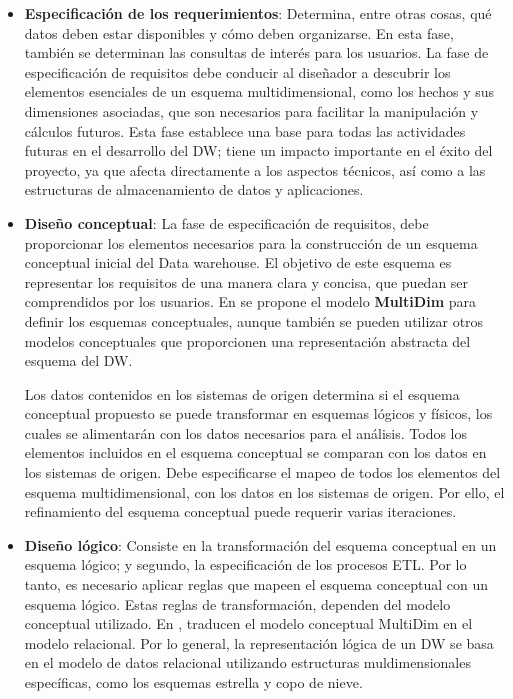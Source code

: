 \documentclass[a4paper,11pt]{article}
\begin{document}
    \begin{itemize}
      \item \textbf{Especificación de los requerimientos}:
      Determina, entre otras cosas, qué datos deben estar disponibles y cómo deben organizarse. En esta fase, también se determinan las consultas de interés
      para los usuarios. La fase de especificación de requisitos debe conducir al diseñador a descubrir los elementos esenciales de un esquema multidimensional,
      como los hechos y sus dimensiones asociadas, que son necesarios para facilitar la manipulación y cálculos futuros. Esta fase establece una base para todas
      las actividades futuras en el desarrollo del DW; tiene un impacto importante en el éxito del proyecto, ya que afecta directamente a los aspectos técnicos,
      así como a las estructuras de almacenamiento de datos y aplicaciones.
      
      \item \textbf{Diseño conceptual}:
      La fase de especificación de requisitos, debe proporcionar los elementos necesarios para la construcción de un esquema conceptual inicial del Data warehouse.
      El objetivo de este esquema es representar los requisitos de una manera clara y concisa, que puedan ser comprendidos por los usuarios. 
      En \cite{VaismanZimanyi14} se propone el modelo \textbf{MultiDim} para definir los esquemas conceptuales, aunque también se pueden utilizar otros modelos
      conceptuales que proporcionen una representación abstracta del esquema del DW.

      Los datos contenidos en los sistemas de origen determina si el esquema conceptual propuesto se puede transformar en esquemas lógicos y físicos, los cuales se
      alimentarán con los datos necesarios para el análisis.
      Todos los elementos incluidos en el esquema conceptual se comparan con los datos en los sistemas de origen.
      Debe especificarse el mapeo de todos los elementos del esquema multidimensional, con los datos en los sistemas de origen. Por ello, el refinamiento del esquema
      conceptual puede requerir varias iteraciones.
      
      \item \textbf{Diseño lógico}:
      Consiste en la transformación del esquema conceptual en un esquema lógico; y segundo, la especificación de los procesos ETL.
      Por lo tanto, es necesario aplicar reglas que mapeen el esquema conceptual con un esquema lógico. Estas reglas de transformación, dependen del modelo conceptual
      utilizado. En \cite{VaismanZimanyi14}, traducen el modelo conceptual MultiDim en el modelo relacional.
      Por lo general, la representación lógica de un DW se basa en el modelo de datos relacional utilizando estructuras muldimensionales específicas, como los esquemas
      estrella y copo de nieve.
      

\end{itemize}
\end{document}

